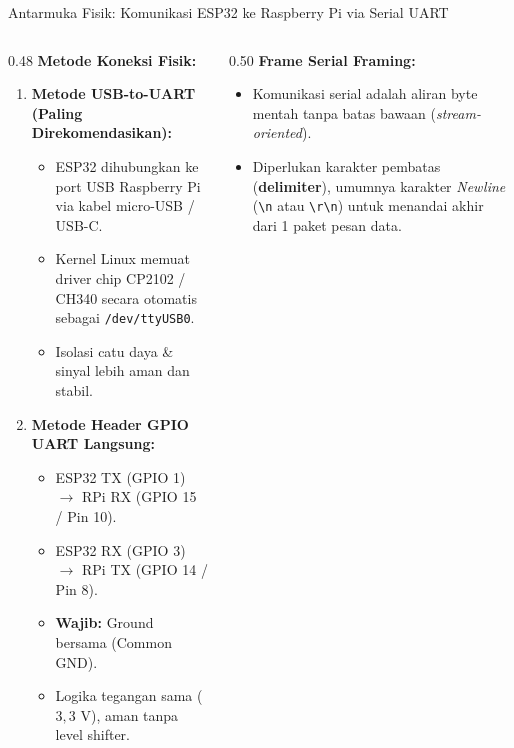 \documentclass[aspectratio=169,10pt]{beamer}
\begin{document}
\begin{frame}{Antarmuka Fisik: Komunikasi ESP32 ke Raspberry Pi via Serial UART}
    \begin{columns}[T]
        \begin{column}{0.48\textwidth}
            \textbf{Metode Koneksi Fisik:}
            \begin{enumerate}
                \item \textbf{Metode USB-to-UART (Paling Direkomendasikan):}
                \begin{itemize}
                    \item ESP32 dihubungkan ke port USB Raspberry Pi via kabel micro-USB / USB-C.
                    \item Kernel Linux memuat driver chip CP2102 / CH340 secara otomatis sebagai \texttt{/dev/ttyUSB0}.
                    \item Isolasi catu daya \& sinyal lebih aman dan stabil.
                \end{itemize}
                \item \textbf{Metode Header GPIO UART Langsung:}
                \begin{itemize}
                    \item ESP32 TX (GPIO 1) $\to$ RPi RX (GPIO 15 / Pin 10).
                    \item ESP32 RX (GPIO 3) $\to$ RPi TX (GPIO 14 / Pin 8).
                    \item \textbf{Wajib:} Ground bersama (Common GND).
                    \item Logika tegangan sama ($3{,}3\text{ V}$), aman tanpa level shifter.
                \end{itemize}
            \end{enumerate}
        \end{column}
        \begin{column}{0.50\textwidth}
            \textbf{Frame Serial Framing:}
            \begin{itemize}
                \item Komunikasi serial adalah aliran byte mentah tanpa batas bawaan (\textit{stream-oriented}).
                \item Diperlukan karakter pembatas (\textbf{delimiter}), umumnya karakter \textit{Newline} (\texttt{\textbackslash n} atau \texttt{\textbackslash r\textbackslash n}) untuk menandai akhir dari 1 paket pesan data.
            \end{itemize}

\end{column}
\end{columns}
\end{frame}
\end{document}
